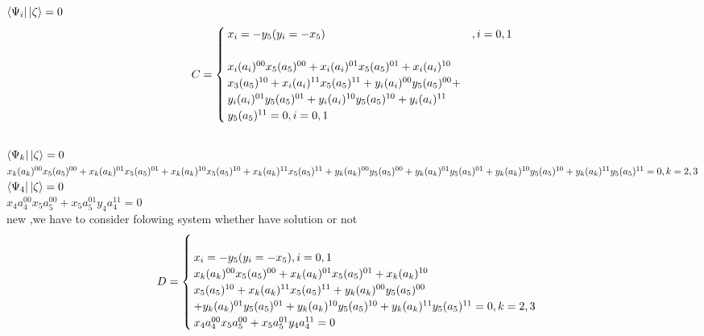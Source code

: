\documentclass[a4paper,12pt]{article}
\begin{document}
\leavevmode
\newline \\

$\bra{\Psi_{i}}\ket{\zeta}=0 $ 
\begin{equation}
C = \begin{cases}
x_{i}=-y_{5}    (  y_{i}=-x_{5})        &   ,i=0,1\\
\newline \\

x_{i}(a_{i})^{00}x_{5}(a_{5})^{00}+x_{i}(a_{i})^{01}x_{5}(a_{5})^{01}+x_{i}(a_{i})^{10}\\
x_{3}(a_{5})^{10}+x_{i}(a_{i})^{11}x_{5}(a_{5})^{11}+y_{i}(a_{i})^{00}y_{5}(a_{5})^{00}+\\
y_{i}(a_{i})^{01}y_{5}(a_{5})^{01}+y_{i}(a_{i})^{10}y_{5}(a_{5})^{10}+y_{i}(a_{i})^{11}\\
y_{5}(a_{5})^{11}=0  
,    i=0,1
\end{cases}
\end{equation}
\newline \\
$\bra{\Psi_{k}}\ket{\zeta}=0 $
\newline \\
$x_{k}(a_{k})^{00}x_{5}(a_{5})^{00}+x_{k}(a_{k})^{01}x_{5}(a_{5})^{01}+x_{k}(a_{k})^{10}\\
x_{5}(a_{5})^{10}+x_{k}(a_{k})^{11}x_{5}(a_{5})^{11}+y_{k}(a_{k})^{00}y_{5}(a_{5})^{00}+
y_{k}(a_{k})^{01}y_{5}(a_{5})^{01}+y_{k}(a_{k})^{10}y_{5}(a_{5})^{10}+y_{k}(a_{k})^{11}
y_{5}(a_{5})^{11}=0 
, k=2,3$
\newline \\
$\bra{\Psi_{4}}\ket{\zeta}=0 $
\newline \\
$x_{4}a_{4}^{00}x_{5}a_{5}^{00}+x_{5}a_{5}^{01}y_{4}a_{4}^{11}=0$
\leavevmode
\newline \\
new ,we have to consider folowing system whether have solution or not 
\begin{equation}
D=\begin{cases}
\newline \\
x_{i}=-y_{5}    (  y_{i}=-x_{5})      ,i=0,1
\newline \\
x_{k}(a_{k})^{00}x_{5}(a_{5})^{00}+x_{k}(a_{k})^{01}x_{5}(a_{5})^{01}+x_{k}(a_{k})^{10}\\
x_{5}(a_{5})^{10}+x_{k}(a_{k})^{11}x_{5}(a_{5})^{11}+y_{k}(a_{k})^{00}y_{5}(a_{5})^{00}\\+
y_{k}(a_{k})^{01}y_{5}(a_{5})^{01}+y_{k}(a_{k})^{10}y_{5}(a_{5})^{10}+y_{k}(a_{k})^{11}
y_{5}(a_{5})^{11}=0 
, k=2,3
\newline\\
x_{4}a_{4}^{00}x_{5}a_{5}^{00}+x_{5}a_{5}^{01}y_{4}a_{4}^{11}=0
\end{cases}	
\end{equation}
\end{document}
